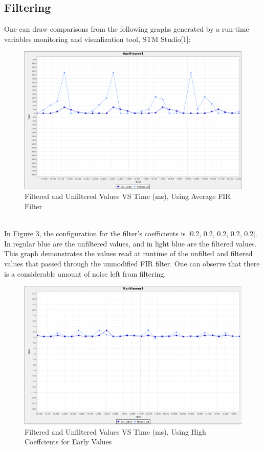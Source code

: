 \documentclass[12pt]{report}
\begin{document}
\subsection{Filtering}\label{testfiltering}
One can draw comparisons from the following graphs generated by a run-time variables monitoring and
visualization tool, STM Studio[1]:\\
\begin{figure}[h] %
	\caption{Filtered and Unfiltered Values VS Time (ms), Using Average FIR Filter}\label{fig3}
	\begin{center}
		\includegraphics[scale=0.5]{./figures/adc_5coeffs.PNG}
	\end{center}
\end{figure}
\\In \hyperref[fig3]{Figure 3}, the configuration for the filter's coefficients is [0.2, 0.2, 0.2, 0.2, 0.2].
In regular blue are the unfiltered values, and in light blue are the filtered values. This graph
demonstrates the values read at runtime of the unfilted and filtered values that passed through the
unmodified FIR filter. One can observe that there is a considerable amount of noise left from
filtering.
\begin{figure}[h] %
	\caption{Filtered and Unfiltered Values VS Time (ms), Using High Coeffcients for Early
	Values}\label{fig4}
	\begin{center}
		\includegraphics[scale=0.5]{./figures/adc_10coeffs_early_high_values.PNG}
	\end{center}
\end{figure}
\end{document}
